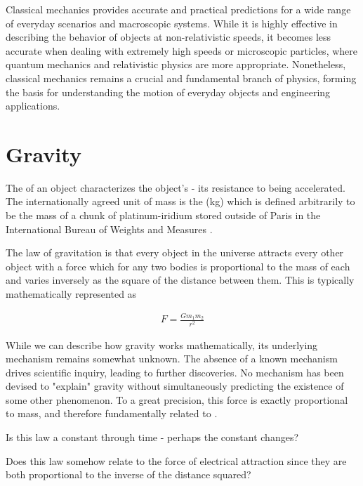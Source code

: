 Classical mechanics provides accurate and practical predictions for a wide range of everyday scenarios and macroscopic systems. While it is highly effective in describing the behavior of objects at non-relativistic speeds, it becomes less accurate when dealing with extremely high speeds or microscopic particles, where quantum mechanics and relativistic physics are more appropriate. Nonetheless, classical mechanics remains a crucial and fundamental branch of physics, forming the basis for understanding the motion of everyday objects and engineering applications.


\section{Gravity}

\begin{defn}{1}
The  of an object characterizes the object's  - its resistance to being accelerated. The internationally agreed unit of mass is the  (kg) which is defined arbitrarily to be the mass of a chunk of platinum-iridium stored outside of Paris in the International Bureau of Weights and Measures \cite{bib:Classical_Mechanics}.
\end{defn}

The law of gravitation is that every object in the universe attracts every other object with a force which for any two bodies is proportional to the mass of each and varies inversely as the square of the distance between them. This is typically mathematically represented as

\begin{align}
F = \frac{Gm_1m_2}{r^2}
\end{align}

While we can describe how gravity works mathematically, its underlying mechanism remains somewhat unknown. The absence of a known mechanism drives scientific inquiry, leading to further discoveries. No mechanism has been devised to "explain" gravity without simultaneously predicting the existence of some other phenomenon. To a great precision, this force is exactly proportional to mass, and therefore fundamentally related to .

\begin{questions}
	\item Is this law a constant through time - perhaps the constant changes?
	\item Does this law somehow relate to the force of electrical attraction since they are both proportional to the inverse of the distance squared?
\end{questions}

